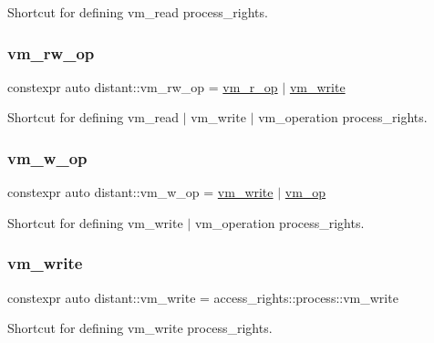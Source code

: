 Shortcut for defining vm\+\_\+read process\+\_\+rights. 

\mbox{\label{namespacedistant_a2548084ad7c93b3e70d1f9e3d3f3cb2c}} 
\subsubsection{\texorpdfstring{vm\+\_\+rw\+\_\+op}{vm\_rw\_op}}
{\footnotesize\ttfamily constexpr auto distant\+::vm\+\_\+rw\+\_\+op = \mbox{\hyperlink{namespacedistant_a22f555d49d1219029220e53628459768}{vm\+\_\+r\+\_\+op}} $\vert$ \mbox{\hyperlink{namespacedistant_a615d59c8cd8088e5d008fe35512e6d5e}{vm\+\_\+write}}}



Shortcut for defining vm\+\_\+read $\vert$ vm\+\_\+write $\vert$ vm\+\_\+operation process\+\_\+rights. 

\mbox{\label{namespacedistant_a6312277824ed2f04c414a61f24c135bb}} 
\subsubsection{\texorpdfstring{vm\+\_\+w\+\_\+op}{vm\_w\_op}}
{\footnotesize\ttfamily constexpr auto distant\+::vm\+\_\+w\+\_\+op = \mbox{\hyperlink{namespacedistant_a615d59c8cd8088e5d008fe35512e6d5e}{vm\+\_\+write}} $\vert$ \mbox{\hyperlink{namespacedistant_af02d4223cd2f509cc373ac9d83655f19}{vm\+\_\+op}}}



Shortcut for defining vm\+\_\+write $\vert$ vm\+\_\+operation process\+\_\+rights. 

\mbox{\label{namespacedistant_a615d59c8cd8088e5d008fe35512e6d5e}} 
\subsubsection{\texorpdfstring{vm\+\_\+write}{vm\_write}}
{\footnotesize\ttfamily constexpr auto distant\+::vm\+\_\+write = access\+\_\+rights\+::process\+::vm\+\_\+write}



Shortcut for defining vm\+\_\+write process\+\_\+rights. 

